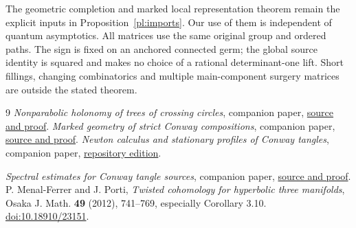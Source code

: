 \documentclass[11pt]{article}
\numberwithin{equation}{section}
\theoremstyle{definition}\newtheorem{definition}[theorem]{Definition}
\theoremstyle{remark}\newtheorem{remark}[theorem]{Remark}
\begin{document}
The geometric completion and marked local representation theorem remain the explicit inputs in Proposition~\ref{pl:imports}. Our use of them is independent of quantum asymptotics. All matrices use the same original group and ordered paths. The sign is fixed on an anchored connected germ; the global source identity is squared and makes no choice of a rational determinant-one lift. Short fillings, changing combinatorics and multiple main-component surgery matrices are outside the stated theorem.

\begin{thebibliography}{9}
 \emph{Nonparabolic holonomy of trees of crossing circles}, companion paper, \href{https://sashakolpakov.github.io/murakamis_dream/papers/nonparabolic-tree-geometry.pdf}{source and proof}.
 \emph{Marked geometry of strict Conway compositions}, companion paper, \href{https://sashakolpakov.github.io/murakamis_dream/papers/strict-conway-geometry.pdf}{source and proof}.
\emph{Newton calculus and stationary profiles of Conway tangles},
companion paper,
\href{https://sashakolpakov.github.io/murakamis_dream/papers/newton-calculus.pdf}{repository edition}.

 \emph{Spectral estimates for Conway tangle sources}, companion paper, \href{https://sashakolpakov.github.io/murakamis_dream/papers/conway-source-bounds.pdf}{source and proof}.
 P. Menal-Ferrer and J. Porti, \emph{Twisted cohomology for hyperbolic three manifolds}, Osaka J. Math. \textbf{49} (2012), 741--769, especially Corollary 3.10. \href{https://doi.org/10.18910/23151}{doi:10.18910/23151}.
\end{thebibliography}
\end{document}
